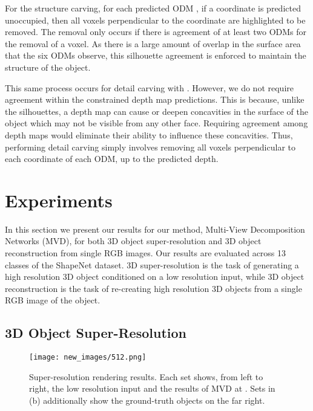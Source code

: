\documentclass{article}
\begin{document}
For the structure carving, for each predicted ODM , if a coordinate is predicted unoccupied, then all voxels perpendicular to the coordinate are highlighted to be removed. The removal only occurs if there is agreement of at least two ODMs for the removal of a voxel. As there is a large amount of overlap in the surface area that the six ODMs observe, this silhouette agreement is enforced to maintain the structure of the object. 

This same process occurs for detail carving with . However, we do not require agreement within the constrained depth map predictions. This is because, unlike the silhouettes, a depth map can cause or deepen concavities in the surface of the object which may not be visible from any other face. Requiring agreement among depth maps would eliminate their ability to influence these concavities. Thus, performing detail carving simply involves removing all voxels perpendicular to each coordinate of each ODM, up to the predicted depth. 

\section{Experiments}
In this section we present our results for our method, Multi-View Decomposition Networks (MVD), for both 3D object super-resolution and 3D object reconstruction from single RGB images. 
Our results are evaluated across 13 classes of the ShapeNet \cite{ShapeNet} dataset. 3D super-resolution is the task of generating a high resolution 3D object conditioned on a low resolution input, while 3D object reconstruction is the task of re-creating high resolution 3D objects from a single RGB image of the object. 

\subsection{3D Object Super-Resolution} \label{sec:exp:3DSR}

\begin{figure*} 
\texttt{[image: new\_images/512.png]}
\centering
\subfloat[]{\hspace{0.6\linewidth}}
\subfloat[]{\hspace{0.4\linewidth}}
\caption{Super-resolution rendering results. Each set shows, from left to right, the low resolution input and the results of MVD at . Sets in (b) additionally show the ground-truth  objects on the far right.} \label{fig:SR_results_512} 
\end{figure*}
\end{document}
